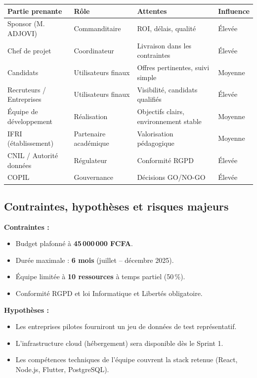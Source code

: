 \documentclass[11pt,a4paper]{article}
\begin{document}
\small
\begin{tabularx}{\textwidth}{|p{3.2cm}|p{2.5cm}|X|p{2cm}|}
    \hline
    \rowcolor{ifrigray}
    \textbf{Partie prenante} & \textbf{Rôle} & \textbf{Attentes} & \textbf{Influence} \\
    \hline
    Sponsor (M. ADJOVI) & Commanditaire & ROI, délais, qualité & Élevée \\
    \hline
    Chef de projet & Coordinateur & Livraison dans les contraintes & Élevée \\
    \hline
    Candidats & Utilisateurs finaux & Offres pertinentes, suivi simple & Moyenne \\
    \hline
    Recruteurs / Entreprises & Utilisateurs finaux & Visibilité, candidats qualifiés & Élevée \\
    \hline
    Équipe de développement & Réalisation & Objectifs clairs, environnement stable & Moyenne \\
    \hline
    IFRI (établissement) & Partenaire académique & Valorisation pédagogique & Moyenne \\
    \hline
    CNIL / Autorité données & Régulateur & Conformité RGPD & Élevée \\
    \hline
    COPIL & Gouvernance & Décisions GO/NO-GO & Élevée \\
    \hline
\end{tabularx}
\normalsize

\subsection{Contraintes, hypothèses et risques majeurs}

\textbf{Contraintes :}
\begin{itemize}
    \item Budget plafonné à \textbf{45\,000\,000 FCFA}.
    \item Durée maximale : \textbf{6 mois} (juillet -- décembre 2025).
    \item Équipe limitée à \textbf{10 ressources} à temps partiel (50\,\%).
    \item Conformité RGPD et loi Informatique et Libertés obligatoire.
\end{itemize}

\textbf{Hypothèses :}
\begin{itemize}
    \item Les entreprises pilotes fourniront un jeu de données de test représentatif.
    \item L'infrastructure cloud (hébergement) sera disponible dès le Sprint 1.
    \item Les compétences techniques de l'équipe couvrent la stack retenue (React, Node.js, Flutter, PostgreSQL).
\end{itemize}
\end{document}
